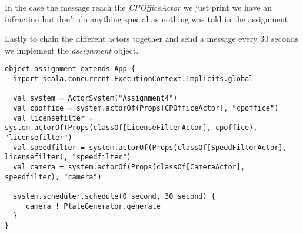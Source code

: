 \documentclass[a4paper,11pt]{article}
\begin{document}
In the case the message reach the \emph{CPOfficeActor} we just print we have an
infraction but don't do anything special as nothing was told in the assignment.

Lastly to chain the different actors together and send a message every 30 seconds
we implement the \emph{assignment} object.

\begin{lstlisting}[style=scala]
object assignment extends App {
  import scala.concurrent.ExecutionContext.Implicits.global

  val system = ActorSystem("Assignment4")
  val cpoffice = system.actorOf(Props[CPOfficeActor], "cpoffice")
  val licensefilter = system.actorOf(Props(classOf[LicenseFilterActor], cpoffice), "licensefilter")
  val speedfilter = system.actorOf(Props(classOf[SpeedFilterActor], licensefilter), "speedfilter")
  val camera = system.actorOf(Props(classOf[CameraActor], speedfilter), "camera")

  system.scheduler.schedule(0 second, 30 second) {
     camera ! PlateGenerator.generate
  }
}
\end{lstlisting}




\end{document}
